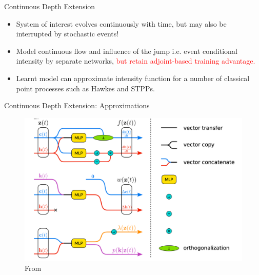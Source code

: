\documentclass{beamer}
\begin{document}
\begin{frame}{Continuous Depth Extension}
    \begin{itemize}
        \item System of interest evolves continuously with time, but may also be interrupted by stochastic events!

        \item Model continuous flow and influence of the jump i.e. event conditional intensity by separate networks, \textcolor{red}{but retain adjoint-based training advantage.}

        \item Learnt model can approximate intensity function for a number of classical point processes such as Hawkes and STPPs. \cite{jia_neural_2020,chen_neural_2020}
    \end{itemize}
\end{frame}

    










\begin{frame}{Continuous Depth Extension: Approximations}
    \begin{figure}
        \centering
        \includegraphics[width=0.75\linewidth]{slides_20231201//figures/NJSDE_Architectures.png}
        \caption{From \cite{jia_neural_2020}}
        \label{fig:njsde_arch}
    \end{figure}
\end{frame}
\end{document}
